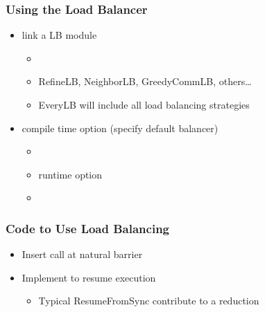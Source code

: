 \begin{frame}[fragile]
\frametitle{Using the Load Balancer}
\begin{itemize}
\item link a LB module 
\begin{itemize}
\item {}
\item RefineLB, NeighborLB, GreedyCommLB, others…
\item EveryLB will include all load balancing strategies
\end{itemize}
\item compile time option (specify default balancer)
\begin{itemize}
\item {}
\item runtime option
\item {}
\end{itemize}
\end{itemize}
\end{frame}

\begin{frame}
\frametitle{Code to Use Load Balancing}
\begin{itemize}
\item Insert  call at natural barrier
\item Implement  to resume execution
\begin{itemize}
\item Typical ResumeFromSync contribute to a reduction
\end{itemize}
\end{itemize}
\end{frame}


